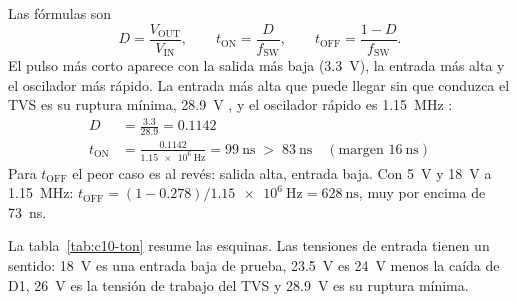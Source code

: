 \begin{calculo}
Las fórmulas son
\begin{equation}\label{eq:c10-ton}
D = \frac{V_\text{OUT}}{V_\text{IN}}, \qquad t_\text{ON} = \frac{D}{f_\text{SW}}, \qquad t_\text{OFF} = \frac{1-D}{f_\text{SW}}.
\end{equation}
El pulso más corto aparece con la salida más baja (\SI{3.3}{\volt}), la entrada más alta y el oscilador más rápido.
La entrada más alta que puede llegar sin que conduzca el TVS es su ruptura mínima, \SI{28.9}{\volt} \copia, y el
oscilador rápido es \SI{1.15}{\mega\hertz} :
\begin{align}
D &= \frac{\num{3.3}}{\num{28.9}} = \num{0.1142}\\
t_\text{ON} &= \frac{\num{0.1142}}{\SI{1.15e6}{\hertz}} = \SI{99}{\nano\second} \;>\; \SI{83}{\nano\second}\quad(\text{margen } \SI{16}{\nano\second})
\end{align}
Para $t_\text{OFF}$ el peor caso es al revés: salida alta, entrada baja. Con \SI{5}{\volt} y \SI{18}{\volt} a
\SI{1.15}{\mega\hertz}: $t_\text{OFF} = (1 - \num{0.278})/\SI{1.15e6}{\hertz} = \SI{628}{\nano\second}$, muy por
encima de \SI{73}{\nano\second}.
\end{calculo}

La tabla~\ref{tab:c10-ton} resume las esquinas. Las tensiones de entrada tienen un sentido: \SI{18}{\volt} es una
entrada baja de prueba, \SI{23.5}{\volt} es \SI{24}{\volt} menos la caída de D1, \SI{26}{\volt} es la tensión de
trabajo del TVS y \SI{28.9}{\volt} es su ruptura mínima.

